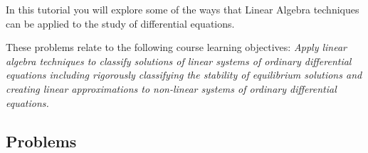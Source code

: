 		\begin{objectives}
			In this tutorial you will explore some of the ways that Linear Algebra techniques can be applied to the
			study of differential equations.

				These problems relate to the following course learning objectives:
						\textit{Apply linear algebra techniques to classify solutions of linear systems of ordinary differential
			equations including rigorously classifying the stability of equilibrium solutions and creating
			linear approximations to non-linear systems of ordinary differential equations.}
		\end{objectives}

		\vspace{-.5em}
		\subsection*{Problems}
		\vspace{-.5em}


